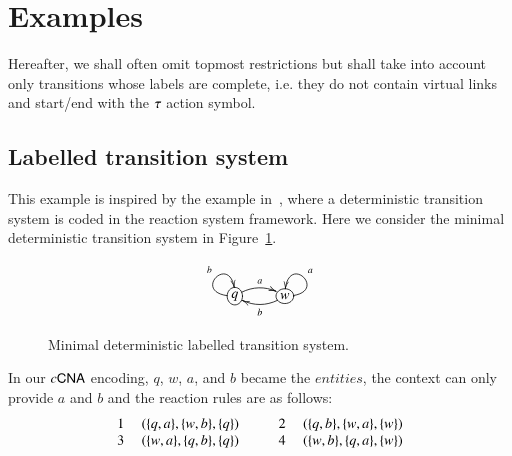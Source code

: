 \section{Examples}
\label{ex:examples}

Hereafter, we shall often omit topmost restrictions but shall take into account only transitions whose labels are complete, i.e. they do not contain 
virtual links and start/end with the $\tau$ action symbol.



\subsection{Labelled transition system}
This example is inspired by the example in~\cite{BEMR11}, where
a deterministic transition system is coded in the reaction system
framework.
Here we consider the minimal deterministic transition system in Figure~\ref{fig:lts}.
\begin{figure}
\[
\xymatrix{
*+[o][F-]{q} \ar@/ ^/[r]^a \ar@(l,u)[]^b &
*+[o][F-]{w} \ar@/^/[l]^b \ar@(r,u)[]_a
}
\]
\caption{Minimal deterministic labelled transition system.}
\label{fig:lts}
\end{figure}
\noindent
In our $c\textsf{CNA}$ encoding, $q$, $w$, $a$, and $b$ became the $entities$, the context can only provide $a$ and $b$ and the reaction rules are as follows:\\
\[
\begin{array}{cl@{\hspace{1cm}} cl}
1 \ &(\{q,a\},\{w,b\},\{q\}) & 2\ &(\{q,b\},\{w,a\},\{w\})\\
3 \  &(\{w,a\},\{q,b\},\{q\}) & 4\ &(\{w,b\},\{q,a\},\{w\})\\ 
\end{array}
\]
